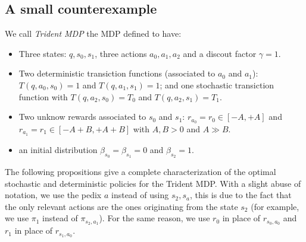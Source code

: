 \subsection{A small counterexample}\label{sec:counter}

We call \textit{Trident MDP} the MDP defined to have:
\begin{itemize}
\item Three states: $q, s_0, s_1$, three actions $a_0, a_1, a_2$ and a discout factor $\gamma=1$.
\item Two deterministic transiction functions (associated to $a_0$ and $a_1$): $T(q,a_0,s_0)=1$ and $T(q,a_1,s_1)=1$; and one stochastic transiction function with $T(q,a_2,s_0)=T_0$ and $T(q,a_2,s_1)=T_1$. 	 
\item Two unknow rewards associated to $s_0$ and $s_1$: $r_{a_0}= r_0\in[-A,+A]$ and $r_{a_1}= r_1\in[-A+B,+A+B]$ with $A,B > 0$ and $A \gg B$.
\item an initial distribution $\beta_{s_0}= \beta_{s_1}=0$ and $\beta_{s_2}=1$.
\end{itemize} 



The following propositions give a complete characterization of the optimal stochastic and deterministic policies for the Trident MDP. With a slight abuse of notation, we use the pedix $a$ instead of using $s_2,s_a$, this is due to the fact that the only relevant actions are the ones originating from the state $s_2$ (for example, we use $\pi_1$ instead of $\pi_{s_2, a_1}$). For the same reason, we use $r_{0}$ in place of $r_{s_0, a_0}$ and $r_{1}$ in place of $r_{s_1, a_0}$.


